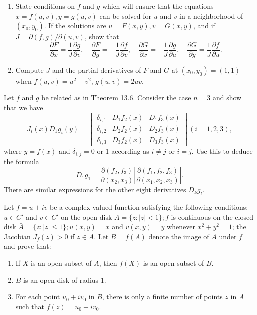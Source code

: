 \begin{problembox}
\begin{enumerate}[label=(\alph*)]
    \item State conditions on \( f \) and \( g \) which will ensure that the equations \( x = f(u, v), y = g(u, v) \) can be solved for \( u \) and \( v \) in a neighborhood of \( (x_0, y_0) \). If the solutions are \( u = F(x, y), v = G(x, y) \), and if \( J = \partial (f, g)/\partial (u, v) \), show that
    \[\frac{\partial F}{\partial x} = \frac{1}{J} \frac{\partial g}{\partial v}, \quad \frac{\partial F}{\partial y} = -\frac{1}{J} \frac{\partial f}{\partial v}, \quad \frac{\partial G}{\partial x} = -\frac{1}{J} \frac{\partial g}{\partial u}, \quad \frac{\partial G}{\partial y} = \frac{1}{J} \frac{\partial f}{\partial u}.\]
    \item Compute \( J \) and the partial derivatives of \( F \) and \( G \) at \((x_0, y_0) = (1, 1)\) when \( f(u, v) = u^2 - v^2 \), \( g(u, v) = 2uv \).
\end{enumerate}
\end{problembox}

\begin{problembox}
Let \( f \) and \( g \) be related as in Theorem 13.6. Consider the case \( n = 3 \) and show that we have
\[J_i(x)D_1g_i(y) =
\begin{vmatrix}
\delta_{i,1} & D_1f_2(x) & D_1f_3(x)\\
\delta_{i,2} & D_2f_2(x) & D_2f_3(x)\\
\delta_{i,3} & D_3f_2(x) & D_3f_3(x)
\end{vmatrix}
(i = 1, 2, 3),\]
where \( y = f(x) \) and \( \delta_{i,j} = 0 \) or 1 according as \( i \neq j \) or \( i = j \). Use this to deduce the formula
\[D_1g_1 = \frac{\partial (f_2, f_3)}{\partial (x_2, x_3)} \left| \frac{\partial (f_1, f_2, f_3)}{\partial (x_1, x_2, x_3)} \right|.\]
There are similar expressions for the other eight derivatives \( D_kg_l \).
\end{problembox}

\begin{problembox}
Let \( f = u + iv \) be a complex-valued function satisfying the following conditions: \( u \in C' \) and \( v \in C' \) on the open disk \( A = \{z : |z| < 1\}; f \) is continuous on the closed disk \( \bar{A} = \{z : |z| \leq 1\}; u(x, y) = x \) and \( v(x, y) = y \) whenever \( x^2 + y^2 = 1 \); the Jacobian \( J_f(z) > 0 \) if \( z \in A \). Let \( B = f(A) \) denote the image of \( A \) under \( f \) and prove that:
\begin{enumerate}[label=(\alph*)]
    \item If \( X \) is an open subset of \( A \), then \( f(X) \) is an open subset of \( B \).
    \item \( B \) is an open disk of radius 1.
    \item For each point \( u_0 + iv_0 \) in \( B \), there is only a finite number of points \( z \) in \( A \) such that \( f(z) = u_0 + iv_0 \).
\end{enumerate}
\end{problembox}

